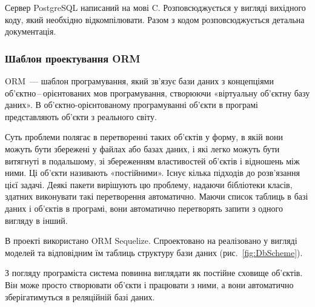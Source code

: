 Сервер PostgreSQL написаний на мові C. Розповсюджується у вигляді вихідного коду, який необхідно відкомпілювати. Разом з кодом розповсюджується детальна документація.

\subsubsection{Шаблон проектування ORM} \label{subs:orm}

ORM~--- шаблон програмування, який зв'язує бази даних з концепціями об'єктно\,--\,орієнтованих мов програмування, створюючи «віртуальну об'єктну базу даних». В об'єктно-орієнтованому програмуванні об'єкти в програмі представляють об'єкти з реального світу. 

Суть проблеми полягає в перетворенні таких об'єктів у форму, в якій вони можуть бути збережені у файлах або базах даних, і які легко можуть бути витягнуті в подальшому, зі збереженням властивостей об'єктів і відношень між ними. Ці об'єкти називають «постійними». Існує кілька підходів до розв'язання цієї задачі. Деякі пакети вирішують цю проблему, надаючи бібліотеки класів, здатних виконувати такі перетворення автоматично. Маючи список таблиць в базі даних і об'єктів в програмі, вони автоматично перетворять запити з одного вигляду в інший.

В проекті використано ORM Sequelize. Спроектовано на реалізовано у вигляді моделей та відповідним їм таблиць структуру бази даних (рис.~\ref{fig:DbScheme}).


З погляду програміста система повинна виглядати як постійне сховище об'єктів. Він може просто створювати об'єкти і працювати з ними, а вони автоматично зберігатимуться в реляційній базі даних.
